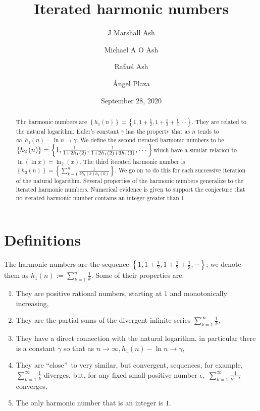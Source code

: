 \documentclass{article}
\begin{document}
\title{Iterated harmonic numbers}
\author{J Marshall Ash \and Michael A O Ash \and Rafael Ash \and \'{A}ngel
Plaza}
\date{September 28, 2020}
\maketitle

\begin{abstract}
The harmonic numbers are $\left\{ h_{1}\left( n\right) \right\} =\left\{ 1,1+%
\frac{1}{2},1+\frac{1}{2}+\frac{1}{3},\cdots \right\} $. They are related to
the natural logarithm: Euler's constant $\gamma $ has the property that as $%
n $ tends to $\infty ,h_{1}\left( n\right) -\ln n\rightarrow \gamma .$ We
define the second iterated harmonic numbers to be $\left\{ h_{2}\left(
n\right) \right\} =\left\{ 1,\frac{1}{1+2h_{1}\left( 2\right) },\frac{1}{%
1+2h_{1}\left( 2\right) +3h_{1}\left( 3\right) },\cdots \right\} $which have
a similar relation to $\ln \left( \ln x\right) =\ln _{2}\left( x\right) .$
The third iterated harmonic number is $\left\{ h_{3}\left( n\right) \right\}
=\left\{ \sum_{k=1}^{n}\frac{1}{kh_{1}\left( k\right) h_{2}\left( k\right) }%
\right\} .$ We go on to do this for each successive iteration of the natural
logarithm. Several properties of the harmonic numbers generalize to the
iterated harmonic numbers. Numerical evidence is given to support the
conjecture that no iterated harmonic number contains an integer greater than 
$1$.
\end{abstract}

\section{Definitions}

The harmonic numbers are the sequence $\left\{ 1,1+\frac{1}{2},1+\frac{1}{2}+%
\frac{1}{3},\cdots \right\} $; we denote them as $h_{1}\left( n\right)
:=\sum_{k=1}^{n}\frac{1}{k}$. Some of their properties are:

\begin{enumerate}
\item They are positive rational numbers, starting at $1$ and monotonically
increasing,

\item They are the partial sums of the divergent infinite series $%
\sum_{k=1}^{\infty }\frac{1}{k},$

\item They have a direct connection with the natural logarithm, in
particular there is a constant $\gamma $ so that as $n\rightarrow \infty
,h_{1}\left( n\right) -\ln n\rightarrow \gamma ,$

\item They are \textquotedblleft close\textquotedblright\ to very similar,
but convergent, sequences, for example, $\sum_{k=1}^{\infty }\frac{1}{k}$
diverges, but, for any fixed small positive number $\epsilon ,$ $%
\sum_{k=1}^{\infty }\frac{1}{k^{1+\epsilon }}$ converges,

\item The only harmonic number that is an integer is $1$.
\end{enumerate}
\end{document}
